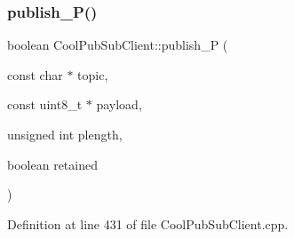 \subsubsection{\texorpdfstring{publish\+\_\+\+P()}{publish\_P()}}
{\footnotesize\ttfamily boolean Cool\+Pub\+Sub\+Client\+::publish\+\_\+P (\begin{DoxyParamCaption}\item[{const char $\ast$}]{topic,  }\item[{const uint8\+\_\+t $\ast$}]{payload,  }\item[{unsigned int}]{plength,  }\item[{boolean}]{retained }\end{DoxyParamCaption})}



Definition at line 431 of file Cool\+Pub\+Sub\+Client.\+cpp.


